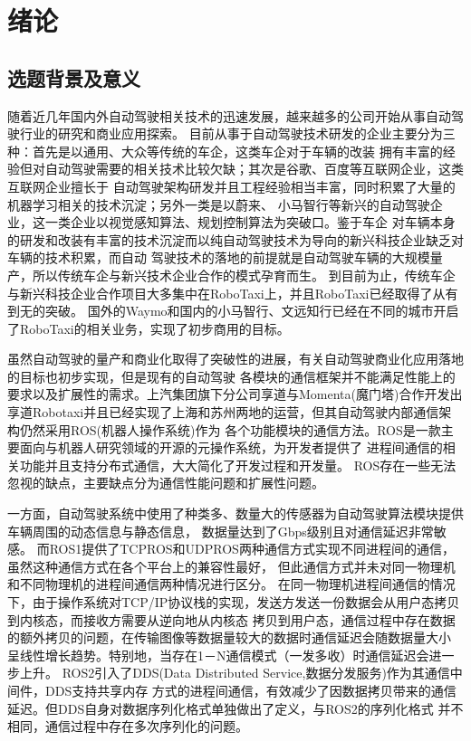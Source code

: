 \chapter{绪论}
\section{选题背景及意义}
随着近几年国内外自动驾驶相关技术的迅速发展，越来越多的公司开始从事自动驾驶行业的研究和商业应用探索\cite{qiuwei}。
目前从事于自动驾驶技术研发的企业主要分为三种：首先是以通用、大众等传统的车企，这类车企对于车辆的改装
拥有丰富的经验但对自动驾驶需要的相关技术比较欠缺；其次是谷歌、百度等互联网企业，这类互联网企业擅长于
自动驾驶架构研发并且工程经验相当丰富，同时积累了大量的机器学习相关的技术沉淀；另外一类是以蔚来、
小马智行等新兴的自动驾驶企业，这一类企业以视觉感知算法、规划控制算法为突破口\cite{xiaoxi}。鉴于车企
对车辆本身的研发和改装有丰富的技术沉淀而以纯自动驾驶技术为导向的新兴科技企业缺乏对车辆的技术积累，而自动
驾驶技术的落地的前提就是自动驾驶车辆的大规模量产，所以传统车企与新兴技术企业合作的模式孕育而生\cite{yty}。
到目前为止，传统车企与新兴科技企业合作项目大多集中在RoboTaxi上，并且RoboTaxi已经取得了从有到无的突破。
国外的Waymo和国内的小马智行、文远知行已经在不同的城市开启了RoboTaxi的相关业务，实现了初步商用的目标\cite{xmh}。

虽然自动驾驶的量产和商业化取得了突破性的进展，有关自动驾驶商业化应用落地的目标也初步实现，但是现有的自动驾驶
各模块的通信框架并不能满足性能上的要求以及扩展性的需求。上汽集团旗下分公司享道与Momenta(魔门塔)合作开发出
享道Robotaxi并且已经实现了上海和苏州两地的运营，但其自动驾驶内部通信架构仍然采用ROS(机器人操作系统)作为
各个功能模块的通信方法\cite{zzq}。ROS是一款主要面向与机器人研究领域的开源的元操作系统，为开发者提供了
进程间通信的相关功能并且支持分布式通信，大大简化了开发过程和开发量。
ROS存在一些无法忽视的缺点，主要缺点分为通信性能问题和扩展性问题\cite{9545285}。

一方面，自动驾驶系统中使用了种类多、数量大的传感器为自动驾驶算法模块提供车辆周围的动态信息与静态信息，
数据量达到了Gbps级别且对通信延迟非常敏感。
而ROS1提供了TCPROS和UDPROS两种通信方式实现不同进程间的通信，虽然这种通信方式在各个平台上的兼容性最好，
但此通信方式并未对同一物理机和不同物理机的进程间通信两种情况进行区分。
在同一物理机进程间通信的情况下，由于操作系统对TCP/IP协议栈的实现，发送方发送一份数据会从用户态拷贝到内核态，而接收方需要从逆向地从内核态
拷贝到用户态，通信过程中存在数据的额外拷贝的问题，在传输图像等数据量较大的数据时通信延迟会随数据量大小
呈线性增长趋势。特别地，当存在1－N通信模式（一发多收）时通信延迟会进一步上升\cite{9591166,Maruyama2016ExploringTP}。
ROS2引入了DDS(Data Distributed Service,数据分发服务)作为其通信中间件\cite{8607261}，DDS支持共享内存
方式的进程间通信，有效减少了因数据拷贝带来的通信延迟。但DDS自身对数据序列化格式单独做出了定义，与ROS2的序列化格式
并不相同，通信过程中存在多次序列化的问题\cite{Maruyama2016ExploringTP}。

